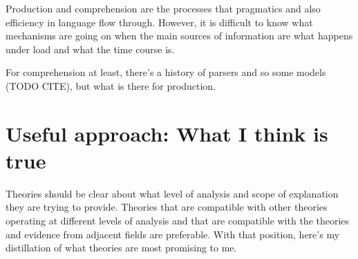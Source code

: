 \documentclass[]{article}
\begin{document}
Production and comprehension are the processes that pragmatics and also efficiency in language flow through. However, it is difficult to know what mechanisms are going on when the main sources of information are what happens under load and what the time course is. 

For comprehension at least, there's a history of parsers and so some models (TODO CITE), but what is there for production. 





%
%
%
%
%






\section{Useful approach: What I think is true}
Theories should be clear about what level of analysis and scope of explanation they are trying to provide. Theories that are compatible with other theories operating at different levels of analysis and that are compatible with the theories and evidence from adjacent fields are preferable. With that position, here's my distillation of what theories are most promising to me. 
\end{document}
